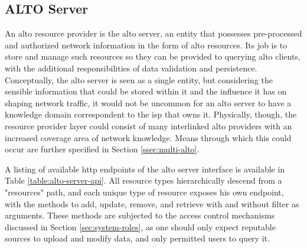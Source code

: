 \subsection{ALTO Server}

    An \gls{alto} resource provider is the \gls{alto} server, an entity that possesses pre-processed and authorized network information in the form of \gls{alto} resources.
    Its job is to store and manage such resources so they can be provided to querying \gls{alto} clients, with the additional responsibilities of data validation and persistence.
    Conceptually, the \gls{alto} server is seen as a single entity, but considering the sensible information that could be stored within it and the influence it has on shaping network traffic, it would not be uncommon for an \gls{alto} server to have a knowledge domain correspondent to the \gls{isp} that owns it.
    Physically, though, the resource provider layer could consist of many interlinked \gls{alto} providers with an increased coverage area of network knowledge.
    Means through which this could occur are further specified in Section \ref{ssec:multi-alto}.

    A listing of available \gls{http} endpoints of the \gls{alto} server interface is available in Table \ref{table:alto-server-api}.
    All resource types hierarchically descend from a "resources" path, and each unique type of resource exposes his own endpoint, with the methods to add, update, remove, and retrieve with and without filter as arguments.
    These methods are subjected to the access control mechanisms discussed in Section \ref{sec:system-roles}, as one should only expect reputable sources to upload and modify data, and only permitted users to query it.

